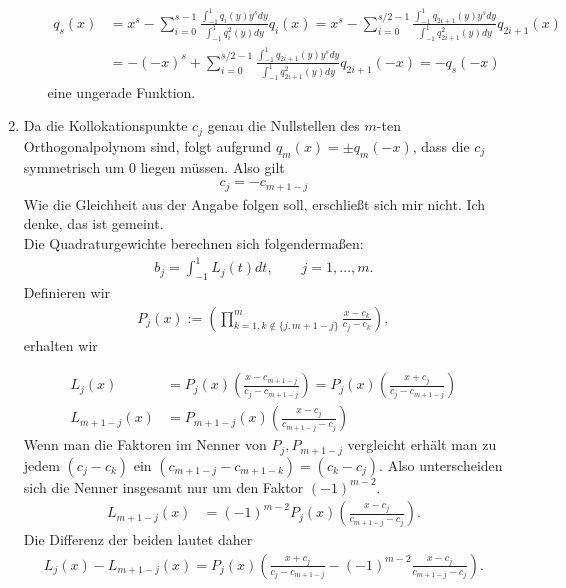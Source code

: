 \begin{solution}
\begin{enumerate}[label = \textbf{\alph*)}]
\begin{itemize}
  \begin{align*}
    q_s(x) &= x^s - \sum_{i = 0}^{s-1}\frac{\int_{-1}^1 q_i(y) y^s dy}{\int_{-1}^1 q_i^2(y) dy}q_i(x)
    = x^s - \sum_{i = 0}^{s/2-1}\frac{\int_{-1}^1q_{2i+1}(y)y^s dy}{\int_{-1}^1q_{2i+1}^2(y)dy}q_{2i+1}(x)\\
    &= -(-x)^s +
    \sum_{i = 0}^{s/2-1}\frac{\int_{-1}^1q_{2i+1}(y)y^s dy}{\int_{-1}^1q_{2i+1}^2(y)dy}q_{2i+1}(-x)
    = -q_s(-x)
  \end{align*}
  eine ungerade Funktion.
\end{itemize}
\item Da die Kollokationspunkte $c_j$ genau die Nullstellen des $m$-ten Orthogonalpolynom sind,
folgt aufgrund $q_{m}(x) = \pm q_m(-x)$, dass die $c_j$ symmetrisch um 0 liegen müssen.
Also gilt
\begin{align*}
  c_j = -c_{m+1-j}
\end{align*}
Wie die Gleichheit aus der Angabe folgen soll, erschließt sich mir nicht.
Ich denke, das ist gemeint. \\
Die Quadraturgewichte berechnen sich folgendermaßen:
\begin{align*}
  b_j = \int_{-1}^1 L_j(t) dt, \qquad j = 1,\dots,m.
\end{align*}
Definieren wir
\begin{align*}
  P_j(x) := \left(\prod_{k = 1, k \notin \{j,m+1-j\}}^m\frac{x - c_k}{c_j - c_k}\right),
\end{align*}
erhalten wir

\begin{align*}
  L_j(x) &= P_j(x)\left(\frac{x - c_{m+1-j}}{c_j - c_{m+1-j}}\right) = P_j(x)\left(\frac{x + c_{j}}{c_j - c_{m+1-j}}\right)\\
  L_{m+1-j}(x) &= P_{m+1-j}(x)\left(\frac{x - c_{j}}{c_{m+1-j} - c_j}\right)
\end{align*}
Wenn man die Faktoren im Nenner von $P_j, P_{m+1-j}$ vergleicht erhält man zu jedem $(c_j - c_k)$
ein $(c_{m+1-j}- c_{m+1-k}) = (c_k - c_j)$. Also unterscheiden sich die Nenner
insgesamt nur um den Faktor $(-1)^{m-2}$.
\begin{align*}
  L_{m+1-j}(x) &= (-1)^{m-2}P_{j}(x)\left(\frac{x - c_{j}}{c_{m+1-j} - c_j}\right).
\end{align*}
Die Differenz der beiden lautet daher
\begin{align*}
  L_j(x) - L_{m+1-j}(x) = P_j(x)\left(\frac{x + c_{j}}{c_j - c_{m+1-j}} - (-1)^{m-2}\frac{x - c_{j}}{c_{m+1-j} - c_j}\right).
\end{align*}
\end{enumerate}
\end{solution}
